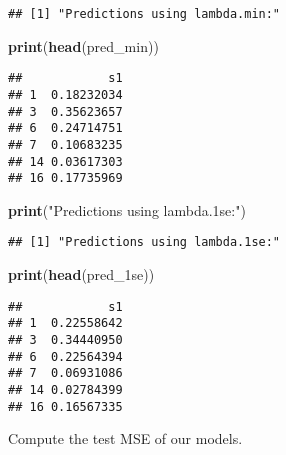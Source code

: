 \documentclass[
]{article}
\newenvironment{Shaded}{\begin{snugshade}}{\end{snugshade}}
\newcommand{\FunctionTok}[1]{\textcolor[rgb]{0.13,0.29,0.53}{\textbf{#1}}}
\newcommand{\NormalTok}[1]{#1}
\newcommand{\StringTok}[1]{\textcolor[rgb]{0.31,0.60,0.02}{#1}}
\begin{document}
\begin{verbatim}
## [1] "Predictions using lambda.min:"
\end{verbatim}

\begin{Shaded}
\begin{Highlighting}[]
\FunctionTok{print}\NormalTok{(}\FunctionTok{head}\NormalTok{(pred\_min))}
\end{Highlighting}
\end{Shaded}

\begin{verbatim}
##            s1
## 1  0.18232034
## 3  0.35623657
## 6  0.24714751
## 7  0.10683235
## 14 0.03617303
## 16 0.17735969
\end{verbatim}

\begin{Shaded}
\begin{Highlighting}[]
\FunctionTok{print}\NormalTok{(}\StringTok{"Predictions using lambda.1se:"}\NormalTok{)}
\end{Highlighting}
\end{Shaded}

\begin{verbatim}
## [1] "Predictions using lambda.1se:"
\end{verbatim}

\begin{Shaded}
\begin{Highlighting}[]
\FunctionTok{print}\NormalTok{(}\FunctionTok{head}\NormalTok{(pred\_1se))}
\end{Highlighting}
\end{Shaded}

\begin{verbatim}
##            s1
## 1  0.22558642
## 3  0.34440950
## 6  0.22564394
## 7  0.06931086
## 14 0.02784399
## 16 0.16567335
\end{verbatim}

Compute the test MSE of our models.
\end{document}
